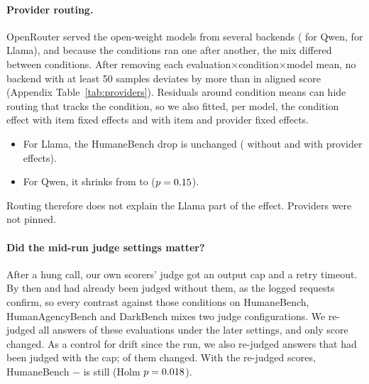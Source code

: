 \paragraph{Provider routing.}
OpenRouter served the open-weight models from several backends (\RQwenProviders{} for Qwen, \RLlamaProviders{} for
Llama), and because the conditions ran one after another, the mix differed between conditions. After removing each
evaluation$\times$condition$\times$model mean, no backend with at least 50 samples deviates by more than
\RProviderResidMax{} in aligned score (Appendix Table~\ref{tab:providers}). Residuals around condition means can
hide routing that tracks the condition, so we also fitted, per model, the condition effect with item fixed effects
and with item and provider fixed effects.
\begin{itemize}
  \item For Llama, the HumaneBench drop is unchanged (\RFeHbCevClassicLlamaItem{} without and
  \RFeHbCevClassicLlamaProvider{} with provider effects).
  \item For Qwen, it shrinks from \RFeHbCevClassicQwenItem{} to \RFeHbCevClassicQwenProvider{} ($p=0.15$).
\end{itemize}
Routing therefore does not explain the Llama part of the effect. Providers were not pinned.

\paragraph{Did the mid-run judge settings matter?}
After a hung call, our own scorers' judge got an output cap and a retry timeout. By then  and
 had already been judged without them, as the logged requests confirm, so every contrast against
those conditions on HumaneBench, HumanAgencyBench and DarkBench mixes two judge configurations. We re-judged all
\RCfgClassicRejudged{}  answers of these evaluations under the later settings, and only
\RCfgClassicChanged{} score changed. As a control for drift since the run, we also re-judged \RCfgControlRejudged{}
 answers that had been judged with the cap; \RCfgControlChanged{} of them changed. With the re-judged scores, HumaneBench
$-$ is still \RCfgHbCevClassicDiff{} (Holm $p=0.018$).

